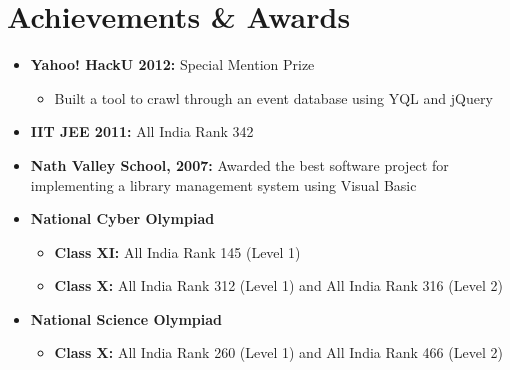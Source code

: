 \documentclass[letterpaper,11pt]{resume}
\begin{document}
\begin{multicols}{2}
{\begin{itemize}
{\begin{itemize}
  \end{itemize}
 }
\end{itemize}
\vspace{5em}
%    
}
\end{multicols}
\section{Achievements \& Awards}
\begin{itemize}
  \item {\bf Yahoo! HackU 2012:} Special Mention Prize
    \begin{itemize}
     \item Built a tool to crawl through an event database using YQL and jQuery
    \end{itemize}
  \item {\bf IIT JEE 2011: }All India Rank 342 
  \item {\bf Nath Valley School, 2007:} Awarded the best software project for implementing a library management system using Visual Basic
  \item {\bf National Cyber Olympiad} 
    \begin{itemize}
     \item {\bf Class XI:} All India Rank 145 (Level 1)
     \item {\bf Class X:} All India Rank 312 (Level 1) and All India Rank 316 (Level 2) 
    \end{itemize}
  \item {\bf National Science Olympiad}
    \begin{itemize}
      \item {\bf Class X:} All India Rank 260 (Level 1) and All India Rank 466 (Level 2) 
    \end{itemize}
  \end{itemize}  %
\pagebreak
\end{document}
